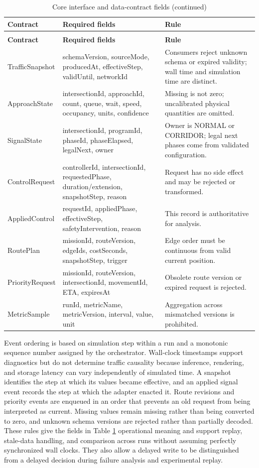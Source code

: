 \begin{longtable}{p{}p{}p{}}
\caption{Core interface and data-contract fields}\label{tab:contracts}\\
\toprule
\textbf{Contract} & \textbf{Required fields} & \textbf{Rule}\\
\midrule\endfirsthead
\caption[]{Core interface and data-contract fields (continued)}\\
\toprule
\textbf{Contract} & \textbf{Required fields} & \textbf{Rule}\\
\midrule\endhead
TrafficSnapshot & schemaVersion, sourceMode, producedAt, effectiveStep, validUntil, networkId & Consumers reject unknown schema or expired validity; wall time and simulation time are distinct.\\
ApproachState & intersectionId, approachId, count, queue, wait, speed, occupancy, units, confidence & Missing is not zero; uncalibrated physical quantities are omitted.\\
SignalState & intersectionId, programId, phaseId, phaseElapsed, legalNext, owner & Owner is NORMAL or CORRIDOR; legal next phases come from validated configuration.\\
ControlRequest & controllerId, intersectionId, requestedPhase, duration/extension, snapshotStep, reason & Request has no side effect and may be rejected or transformed.\\
AppliedControl & requestId, appliedPhase, effectiveStep, safetyIntervention, reason & This record is authoritative for analysis.\\
RoutePlan & missionId, routeVersion, edgeIds, costSeconds, snapshotStep, trigger & Edge order must be continuous from valid current position.\\
PriorityRequest & missionId, routeVersion, intersectionId, movementId, ETA, expiresAt & Obsolete route version or expired request is rejected.\\
MetricSample & runId, metricName, metricVersion, interval, value, unit & Aggregation across mismatched versions is prohibited.\\
\bottomrule
\end{longtable}

Event ordering is based on simulation step within a run and a monotonic sequence number assigned by the orchestrator. Wall-clock timestamps support diagnostics but do not determine traffic causality because inference, rendering, and storage latency can vary independently of simulated time. A snapshot identifies the step at which its values became effective, and an applied signal event records the step at which the adapter enacted it. Route revisions and priority events are enqueued in an order that prevents an old request from being interpreted as current. Missing values remain missing rather than being converted to zero, and unknown schema versions are rejected rather than partially decoded. These rules give the fields in Table \ref{tab:contracts} operational meaning and support replay, stale-data handling, and comparison across runs without assuming perfectly synchronized wall clocks. They also allow a delayed write to be distinguished from a delayed decision during failure analysis and experimental replay.

